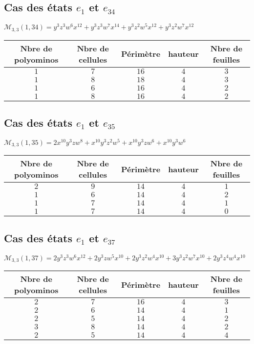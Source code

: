 \subsection*{Cas des états $e_{1}$ et $e_{34}$ }
$\mathcal{M}_{3,3}(1,34)=y^3z^3w^6x^{12}+y^3z^3w^7x^{14}+y^3z^2w^5x^{12}+y^3z^2w^7x^{12}
$\\
\begin{tabular}{|c|c|c|c|c|}
 \hline
  Nbre de polyominos & Nbre de cellules & Périmètre & hauteur &Nbre de feuilles\\
 \hline
 $1$ & $7$ & $16$ & $4$ &$3$\\
 \hline
 $1$ & $8$ & $18$ & $4$ &$3$\\
 \hline
 $1$ & $6$ & $16$ & $4$ &$2$\\
 \hline
 $1$ & $8$ & $16$ & $4$ &$2$\\
 \hline
\end{tabular}
\subsection*{Cas des états $e_{1}$ et $e_{35}$ }
$\mathcal{M}_{3,3}(1,35)=2x^{10}y^3zw^8+x^{10}y^3z^2w^5+x^{10}y^3zw^6+x^{10}y^3w^{6}
$\\
\begin{tabular}{|c|c|c|c|c|}
 \hline
  Nbre de polyominos & Nbre de cellules & Périmètre & hauteur &Nbre de feuilles\\
 \hline
 $2$ & $9$ & $14$ & $4$ &$1$\\
 \hline
 $1$ & $6$ & $14$ & $4$ &$2$\\
 \hline
 $1$ & $7$ & $14$ & $4$ &$1$\\
 \hline
 $1$ & $7$ & $14$ & $4$ &$0$\\
 \hline
\end{tabular}
\subsection*{Cas des états $e_{1}$ et $e_{37}$ }
$\mathcal{M}_{3,3}(1,37)=2y^3z^3w^6x^{12}+2y^3zw^5x^{10}+2y^3z^2w^4x^{10}+3y^3z^2w^7x^{10}+2y^3z^4w^4x^{10
}$\\
\begin{tabular}{|c|c|c|c|c|}
 \hline
  Nbre de polyominos & Nbre de cellules & Périmètre & hauteur &Nbre de feuilles\\
 \hline
 $2$ & $7$ & $16$ & $4$ &$3$\\
 \hline
 $2$ & $6$ & $14$ & $4$ &$1$\\
 \hline
 $2$ & $5$ & $14$ & $4$ &$2$\\
 \hline
 $3$ & $8$ & $14$ & $4$ &$2$\\
 \hline
 $2$ & $5$ & $14$ & $4$ &$4$\\
 \hline
\end{tabular}
